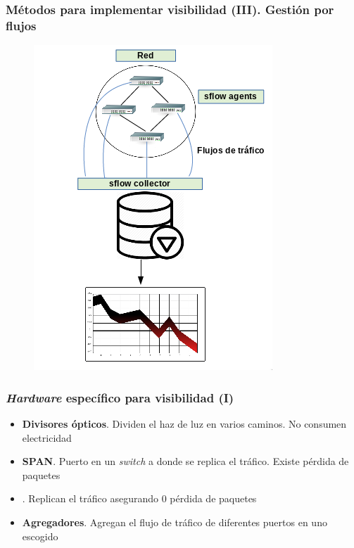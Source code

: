 \documentclass{beamer}
\begin{document}
\begin{frame}
\frametitle{Métodos para implementar visibilidad (III). Gestión por flujos}

\begin{figure}[H]
	\centering
	\includegraphics[scale=0.5]{sflow.png}
	\label{sflow}
\end{figure}

\end{frame}

\begin{frame}

\frametitle{\textit{Hardware} específico para visibilidad (I)}

\begin{itemize}
	\item \textbf{Divisores ópticos}. Dividen el haz de luz en varios caminos. No consumen electricidad
	\item \textbf{SPAN}. Puerto en un \textit{switch} a donde se replica el tráfico. Existe pérdida de paquetes
	\item \textbf{\color{purple}{TAP}}. Replican el tráfico asegurando 0 pérdida de paquetes
	\item \textbf{Agregadores}. Agregan el flujo de tráfico de diferentes puertos en uno escogido
\end{itemize}

\end{frame}
\end{document}
